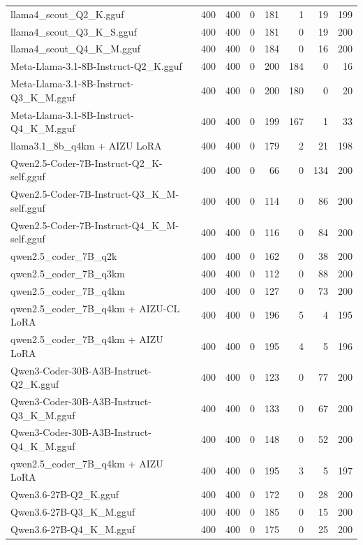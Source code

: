 \begin{table}[htbp]
{\begin{tabular}{lrrrrrrr}
    llama4\_scout\_Q2\_K.gguf & 400 & 400 & 0 & 181 & 1 & 19 & 199 \\
    llama4\_scout\_Q3\_K\_S.gguf & 400 & 400 & 0 & 181 & 0 & 19 & 200 \\
    llama4\_scout\_Q4\_K\_M.gguf & 400 & 400 & 0 & 184 & 0 & 16 & 200 \\
    Meta-Llama-3.1-8B-Instruct-Q2\_K.gguf & 400 & 400 & 0 & 200 & 184 & 0 & 16 \\
    Meta-Llama-3.1-8B-Instruct-Q3\_K\_M.gguf & 400 & 400 & 0 & 200 & 180 & 0 & 20 \\
    Meta-Llama-3.1-8B-Instruct-Q4\_K\_M.gguf & 400 & 400 & 0 & 199 & 167 & 1 & 33 \\
    llama3.1\_8b\_q4km + AIZU LoRA & 400 & 400 & 0 & 179 & 2 & 21 & 198 \\
    Qwen2.5-Coder-7B-Instruct-Q2\_K-self.gguf & 400 & 400 & 0 & 66 & 0 & 134 & 200 \\
    Qwen2.5-Coder-7B-Instruct-Q3\_K\_M-self.gguf & 400 & 400 & 0 & 114 & 0 & 86 & 200 \\
    Qwen2.5-Coder-7B-Instruct-Q4\_K\_M-self.gguf & 400 & 400 & 0 & 116 & 0 & 84 & 200 \\
    qwen2.5\_coder\_7B\_q2k & 400 & 400 & 0 & 162 & 0 & 38 & 200 \\
    qwen2.5\_coder\_7B\_q3km & 400 & 400 & 0 & 112 & 0 & 88 & 200 \\
    qwen2.5\_coder\_7B\_q4km & 400 & 400 & 0 & 127 & 0 & 73 & 200 \\
    qwen2.5\_coder\_7B\_q4km + AIZU-CL LoRA & 400 & 400 & 0 & 196 & 5 & 4 & 195 \\
    qwen2.5\_coder\_7B\_q4km + AIZU LoRA & 400 & 400 & 0 & 195 & 4 & 5 & 196 \\
    Qwen3-Coder-30B-A3B-Instruct-Q2\_K.gguf & 400 & 400 & 0 & 123 & 0 & 77 & 200 \\
    Qwen3-Coder-30B-A3B-Instruct-Q3\_K\_M.gguf & 400 & 400 & 0 & 133 & 0 & 67 & 200 \\
    Qwen3-Coder-30B-A3B-Instruct-Q4\_K\_M.gguf & 400 & 400 & 0 & 148 & 0 & 52 & 200 \\
    qwen2.5\_coder\_7B\_q4km + AIZU LoRA & 400 & 400 & 0 & 195 & 3 & 5 & 197 \\
    Qwen3.6-27B-Q2\_K.gguf & 400 & 400 & 0 & 172 & 0 & 28 & 200 \\
    Qwen3.6-27B-Q3\_K\_M.gguf & 400 & 400 & 0 & 185 & 0 & 15 & 200 \\
    Qwen3.6-27B-Q4\_K\_M.gguf & 400 & 400 & 0 & 175 & 0 & 25 & 200 \\

\end{tabular}}
\end{table}
